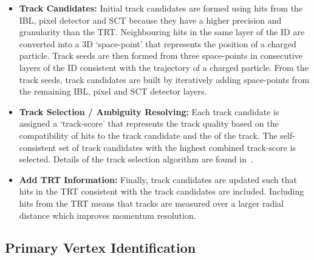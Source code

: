 \begin{itemize}[leftmargin=*]
\item\textbf{Track Candidates:}
  Initial track candidates are formed using hits from the IBL, pixel detector and SCT because they have a higher precision and granularity than the TRT.
  Neighbouring hits in the same layer of the ID are converted into a 3D `space-point' that represents the position of a charged particle.
  Track seeds are then formed from three space-points in consecutive layers of the ID
  consistent with the trajectory of a charged particle. %
  From the track seeds, track candidates are built by iteratively adding space-points
  from the remaining IBL, pixel and SCT detector layers.
  \\\vspace{0.5em}
\item\textbf{Track Selection / Ambiguity Resolving:}
  Each track candidate is assigned a `track-score' that represents the track quality based on
  the compatibility of hits to the track candidate and the \pT{} of the track.
  The self-consistent set of track candidates with the highest combined track-score is selected.
  Details of the track selection algorithm are found in~\cite{obj-tracks_TIDE}.\vspace{0.5em}
\item\textbf{Add TRT Information:}
  Finally, track candidates are updated such that hits in the TRT consistent with the track candidates are included.
  Including hits from the TRT means that tracks are measured over a larger radial distance which improves momentum resolution.
\end{itemize}

\subsection{Primary Vertex Identification}
\label{sec:obj-tracks_pv}


